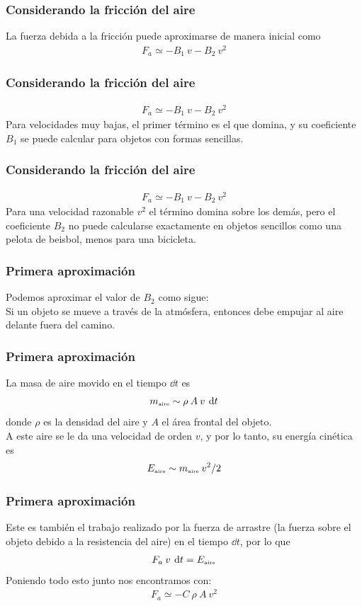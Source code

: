 \begin{frame}
\frametitle{Considerando la fricción del aire}
La fuerza debida a la fricción puede aproximarse de manera inicial como
\begin{align}
F_{a} \simeq - B_{1} \: v - B_{2} \: v^{2}
\label{EqFfriccion}
\end{align}
\end{frame}
\begin{frame}
\frametitle{Considerando la fricción del aire}
\begin{align*}
F_{a} \simeq - B_{1} \: v - B_{2} \: v^{2}
\end{align*}
Para velocidades muy bajas, el primer término es el que domina, y su coeficiente $B_{1}$ se puede calcular para objetos con formas sencillas.
\end{frame}
\begin{frame}
\frametitle{Considerando la fricción del aire}
\begin{align*}
F_{a} \simeq - B_{1} \: v - B_{2} \: v^{2}
\end{align*}
Para una velocidad razonable $v^{2}$ el término domina sobre los demás, pero el coeficiente $B_{2}$ no puede calcularse exactamente en objetos sencillos como una pelota de beisbol, menos para una bicicleta.
\end{frame}
\begin{frame}
\frametitle{Primera aproximación}
Podemos aproximar el valor de $B_{2}$ como sigue:
\\
\medskip
\pause
Si un objeto se mueve a través de la atmósfera, entonces debe empujar al aire delante fuera del camino.
\end{frame}
\begin{frame}
\frametitle{Primera aproximación}
La masa de aire movido en el tiempo $\dd{t}$ es
\begin{align*}
m_{\text{\tiny{aire}}} \sim \rho \: A \: v \: \dd{t}
\end{align*}
donde $\rho$ es la densidad del aire y $A$ el área frontal del objeto. 
\\
\bigskip
\pause
A este aire se le da una velocidad de orden $v$, y por lo tanto, su energía cinética es
\begin{align*}
E_{\text{\tiny{aire}}} \sim m_{\text{\tiny{aire}}} \: v^{2} /2
\end{align*}
\end{frame}
\begin{frame}
\frametitle{Primera aproximación}
Este es también el trabajo realizado por la fuerza de arrastre (la fuerza sobre el objeto debido a la resistencia del aire) en el tiempo $\dd{t}$, por lo que
\begin{align*}
F_{a} \: v \: \dd{t} = E_{\text{\tiny{aire}}}
\end{align*}
\bigskip
\pause
Poniendo todo esto junto nos encontramos con:
\begin{align*}
F_{a} \simeq - C \: \rho \: A \: v^{2}
\end{align*}
\end{frame}

